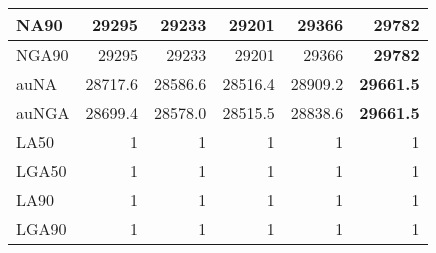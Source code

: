 \documentclass[12pt,a4paper]{article}
\begin{document}
\begin{table}[ht]
\begin{center}
\begin{tabular}{|l*{5}{|r}|}
NA90 & 29295 & 29233 & 29201 & 29366 & {\bf 29782} \\ \hline
NGA90 & 29295 & 29233 & 29201 & 29366 & {\bf 29782} \\ \hline
auNA & 28717.6 & 28586.6 & 28516.4 & 28909.2 & {\bf 29661.5} \\ \hline
auNGA & 28699.4 & 28578.0 & 28515.5 & 28838.6 & {\bf 29661.5} \\ \hline
LA50 & 1 & 1 & 1 & 1 & 1 \\ \hline
LGA50 & 1 & 1 & 1 & 1 & 1 \\ \hline
LA90 & 1 & 1 & 1 & 1 & 1 \\ \hline
LGA90 & 1 & 1 & 1 & 1 & 1 \\ \hline
\end{tabular}
\end{center}
\end{table}
\end{document}
